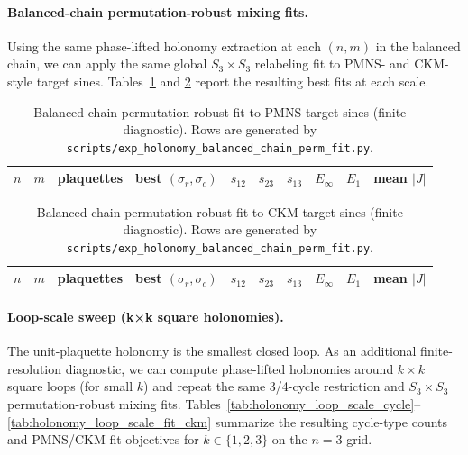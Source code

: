 \paragraph{Balanced-chain permutation-robust mixing fits.}
Using the same phase-lifted holonomy extraction at each $(n,m)$ in the balanced chain, we can apply the same global $S_3\times S_3$ relabeling fit to PMNS- and CKM-style target sines.
Tables~\ref{tab:holonomy_balanced_chain_fit_pmns} and \ref{tab:holonomy_balanced_chain_fit_ckm} report the resulting best fits at each scale.

\begin{table}[t]
\centering
\scriptsize
\setlength{\tabcolsep}{4pt}
\renewcommand{\arraystretch}{1.15}
\begin{tabular}{rrrrrrrrrr}
\toprule
$n$ & $m$ & plaquettes & best $(\sigma_r,\sigma_c)$ & $s_{12}$ & $s_{23}$ & $s_{13}$ & $E_\infty$ & $E_1$ & mean $|J|$ \\
\midrule
%
\end{tabular}
\caption{Balanced-chain permutation-robust fit to PMNS target sines (finite diagnostic). Rows are generated by \texttt{scripts/exp\_holonomy\_balanced\_chain\_perm\_fit.py}.}
\label{tab:holonomy_balanced_chain_fit_pmns}
\end{table}

\begin{table}[t]
\centering
\scriptsize
\setlength{\tabcolsep}{4pt}
\renewcommand{\arraystretch}{1.15}
\begin{tabular}{rrrrrrrrrr}
\toprule
$n$ & $m$ & plaquettes & best $(\sigma_r,\sigma_c)$ & $s_{12}$ & $s_{23}$ & $s_{13}$ & $E_\infty$ & $E_1$ & mean $|J|$ \\
\midrule
%
\end{tabular}
\caption{Balanced-chain permutation-robust fit to CKM target sines (finite diagnostic). Rows are generated by \texttt{scripts/exp\_holonomy\_balanced\_chain\_perm\_fit.py}.}
\label{tab:holonomy_balanced_chain_fit_ckm}
\end{table}

\paragraph{Loop-scale sweep (k×k square holonomies).}
The unit-plaquette holonomy is the smallest closed loop.
As an additional finite-resolution diagnostic, we can compute phase-lifted holonomies around $k\times k$ square loops (for small $k$) and repeat the same 3/4-cycle restriction and $S_3\times S_3$ permutation-robust mixing fits.
Tables~\ref{tab:holonomy_loop_scale_cycle}--\ref{tab:holonomy_loop_scale_fit_ckm} summarize the resulting cycle-type counts and PMNS/CKM fit objectives for $k\in\{1,2,3\}$ on the $n=3$ grid.

